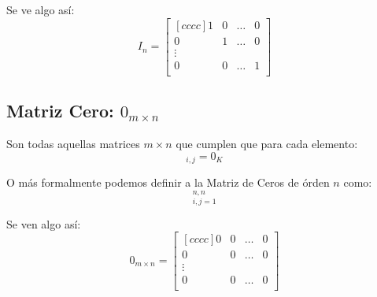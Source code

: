 \documentclass[12pt, fleqn]{report}                             %
\begin{document}
                Se ve algo así:
                \begin{equation*}
                    I_n =
                    \begin{bmatrix}[cccc]
                        1 & 0 & \dots & 0   \\
                        0 & 1 & \dots & 0   \\
                        \vdots              \\
                        0 & 0 & \dots & 1   \\
                    \end{bmatrix}
                \end{equation*}



            \subsection{Matriz Cero: $0_{m \times n}$}

                Son todas aquellas matrices $m \times n$ que cumplen que para cada elemento:
                \begin{equation}
                    [0]_{i,j} = 0_K
                \end{equation}

                O más formalmente podemos definir a la Matriz de Ceros de órden $n$ como:
                \begin{equation}
                    [0_{\mathbb{F}}]_{i, j = 1}^{n, n}
                \end{equation}

                Se ven algo así:
                \begin{equation*}
                    0_{m \times n} =
                    \begin{bmatrix}[cccc]
                        0 & 0 & \dots & 0   \\
                        0 & 0 & \dots & 0   \\
                        \vdots              \\
                        0 & 0 & \dots & 0   \\
                    \end{bmatrix}
                \end{equation*}
\end{document}
